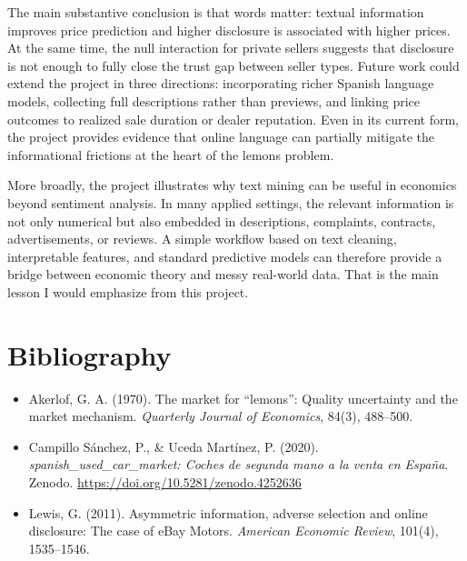 \documentclass[10pt,twocolumn]{article}
\begin{document}
The main substantive conclusion is that words matter: textual information improves price prediction and higher disclosure is associated with higher prices. At the same time, the null interaction for private sellers suggests that disclosure is not enough to fully close the trust gap between seller types. Future work could extend the project in three directions: incorporating richer Spanish language models, collecting full descriptions rather than previews, and linking price outcomes to realized sale duration or dealer reputation. Even in its current form, the project provides evidence that online language can partially mitigate the informational frictions at the heart of the lemons problem.

More broadly, the project illustrates why text mining can be useful in economics beyond sentiment analysis. In many applied settings, the relevant information is not only numerical but also embedded in descriptions, complaints, contracts, advertisements, or reviews. A simple workflow based on text cleaning, interpretable features, and standard predictive models can therefore provide a bridge between economic theory and messy real-world data. That is the main lesson I would emphasize from this project.

\section{Bibliography}
\begin{itemize}[leftmargin=*]
    \item Akerlof, G. A. (1970). The market for ``lemons'': Quality uncertainty and the market mechanism. \textit{Quarterly Journal of Economics}, 84(3), 488--500.
    \item Campillo S\'anchez, P., \& Uceda Mart\'inez, P. (2020). \textit{spanish\_used\_car\_market: Coches de segunda mano a la venta en Espa\~na}. Zenodo. \url{https://doi.org/10.5281/zenodo.4252636}
    \item Lewis, G. (2011). Asymmetric information, adverse selection and online disclosure: The case of eBay Motors. \textit{American Economic Review}, 101(4), 1535--1546.
\end{itemize}
\end{document}

